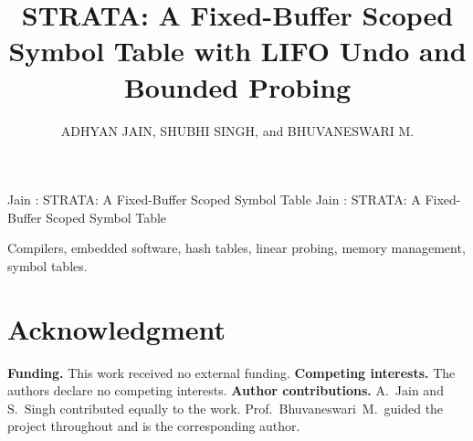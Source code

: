 \documentclass{ieeeaccess}
\begin{document}
\makeatletter{}\makeatother
{}

\title{STRATA: A Fixed-Buffer Scoped Symbol Table with LIFO Undo and Bounded Probing}

\author{\uppercase{Adhyan Jain},
\uppercase{Shubhi Singh}, and
\uppercase{Bhuvaneswari M.}}

\address[1]{School of Computer Science and Engineering, Vellore Institute of Technology, Vellore, Tamil Nadu 632014, India}


\markboth
{Jain \headeretal: STRATA: A Fixed-Buffer Scoped Symbol Table}
{Jain \headeretal: STRATA: A Fixed-Buffer Scoped Symbol Table}


\begin{abstract}

\end{abstract}

\begin{keywords}
Compilers, embedded software, hash tables, linear probing, memory management, symbol tables.
\end{keywords}

\titlepgskip=-21pt

\maketitle



\section*{Acknowledgment}
\textbf{Funding.} This work received no external funding. \textbf{Competing interests.} The authors declare no competing interests. \textbf{Author contributions.} A.~Jain and S.~Singh contributed equally to the work. Prof.~Bhuvaneswari~M.\ guided the project throughout and is the corresponding author.
\end{document}

